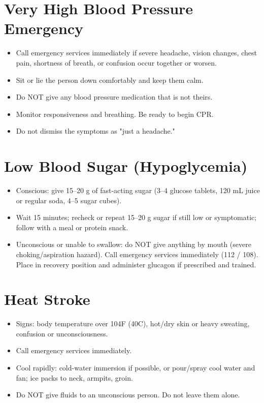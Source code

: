 \section{Very High Blood Pressure Emergency}

\begin{itemize}[leftmargin=*]
\item Call emergency services immediately if severe headache, vision changes, chest pain, shortness of breath, or confusion occur together or worsen.
\item Sit or lie the person down comfortably and keep them calm.
\item Do NOT give any blood pressure medication that is not theirs.
\item Monitor responsiveness and breathing. Be ready to begin CPR.
\item Do not dismiss the symptoms as "just a headache."
\end{itemize}

\section{Low Blood Sugar (Hypoglycemia)}

\begin{itemize}[leftmargin=*]
\item Conscious: give 15--20 g of fast-acting sugar (3--4 glucose tablets, 120 mL juice or regular soda, 4--5 sugar cubes).
\item Wait 15 minutes; recheck or repeat 15--20 g sugar if still low or symptomatic; follow with a meal or protein snack.
\item Unconscious or unable to swallow: do NOT give anything by mouth (severe choking/aspiration hazard). Call emergency services immediately (112 / 108). Place in recovery position and administer glucagon if prescribed and trained.
\end{itemize}

\section{Heat Stroke}

\begin{itemize}[leftmargin=*]
\item Signs: body temperature over 104\textdegree F (40\textdegree C), hot/dry skin or heavy sweating, confusion or unconsciousness.
\item Call emergency services immediately.
\item Cool rapidly: cold-water immersion if possible, or pour/spray cool water and fan; ice packs to neck, armpits, groin.
\item Do NOT give fluids to an unconscious person. Do not leave them alone.
\end{itemize}

